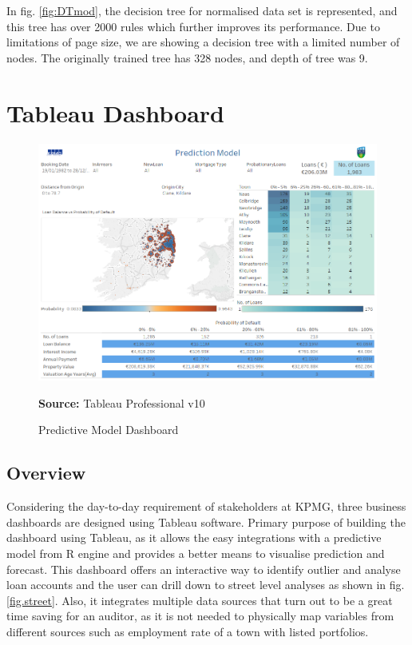 In fig. \ref{fig:DTmod}, the decision tree for normalised data set is represented, and this tree has over 2000 rules which further improves its performance. Due to limitations of page size, we are showing a decision tree with a limited number of nodes. The originally trained tree has 328 nodes, and depth of tree was 9. 

\section{Tableau Dashboard}
\begin{center}
\begin{figure}[!htb]
\includegraphics[scale=0.5]{Predictive.png}
\centering
\caption{Predictive Model Dashboard}{\textbf{Source:} Tableau Professional v10}
\label{fig:overview}
\end{figure}
\end{center}

\subsection{Overview}

Considering the day-to-day requirement of stakeholders at KPMG, three business dashboards are designed using Tableau software. Primary purpose of building the dashboard using Tableau, as it allows the easy integrations with a predictive model from R engine and provides a better means to visualise prediction and forecast. This dashboard offers an interactive way to identify outlier and analyse loan accounts and the user can drill down to street level analyses as shown in fig.\ref{fig.street}. Also, it integrates multiple data sources that turn out to be a great time saving for an auditor, as it is not needed to physically map variables from different sources such as employment rate of a town with listed portfolios.\\

